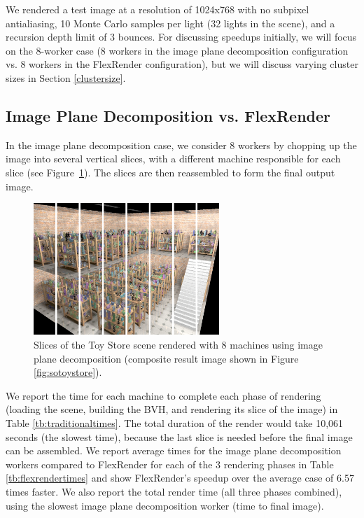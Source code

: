 \documentclass[a4paper,twoside]{article}
\begin{document}
We rendered a test image at a resolution of 1024x768 with no subpixel
antialiasing, 10 Monte Carlo samples per light (32 lights in the scene), and a
recursion depth limit of 3 bounces. For discussing speedups initially, we will
focus on the 8-worker case (8 workers in the image plane decomposition
configuration vs. 8 workers in the FlexRender configuration), but we will
discuss varying cluster sizes in Section \ref{clustersize}.

\subsection{Image Plane Decomposition vs. FlexRender}

In the image plane decomposition case, we consider 8 workers by chopping up the
image into several vertical slices, with a different machine responsible for
each slice (see Figure~\ref{fig:toystoresliced}). The slices are then
reassembled to form the final output image.

\begin{figure}[h!]
    \centering
    \includegraphics[width=70mm]{images/toystore-sliced.png}
    \caption{Slices of the Toy Store scene rendered with 8 machines using image plane decomposition (composite result image shown in Figure \ref{fig:sotoystore}).}
    \label{fig:toystoresliced}
\end{figure}

We report the time for each machine to complete each phase of rendering (loading
the scene, building the BVH, and rendering its slice of the image) in Table
\ref{tb:traditionaltimes}. The total duration of the render would take 10,061
seconds (the slowest time), because the last slice is needed before the final
image can be assembled. We report average times for the image plane decomposition
workers compared to FlexRender for each of the 3 rendering phases in Table
\ref{tb:flexrendertimes} and show FlexRender's speedup over the average case of 6.57 times
faster.
We also report the total render time (all three phases combined), using the
slowest image plane decomposition worker (time to final image).
\end{document}
